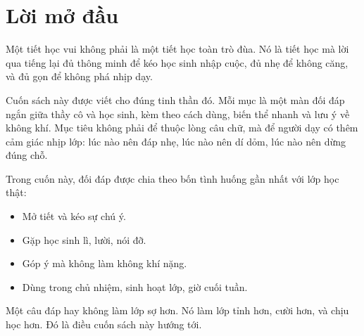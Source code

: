 \chapter*{Lời mở đầu}

Một tiết học vui không phải là một tiết học toàn trò đùa. Nó là tiết học mà lời qua tiếng lại đủ thông minh để kéo học sinh nhập cuộc, đủ nhẹ để không căng, và đủ gọn để không phá nhịp dạy.

Cuốn sách này được viết cho đúng tinh thần đó. Mỗi mục là một màn đối đáp ngắn giữa thầy cô và học sinh, kèm theo cách dùng, biến thể nhanh và lưu ý về không khí. Mục tiêu không phải để thuộc lòng câu chữ, mà để người dạy có thêm cảm giác nhịp lớp: lúc nào nên đáp nhẹ, lúc nào nên dí dỏm, lúc nào nên dừng đúng chỗ.

Trong cuốn này, đối đáp được chia theo bốn tình huống gần nhất với lớp học thật:

\begin{itemize}
\item Mở tiết và kéo sự chú ý.
\item Gặp học sinh lì, lười, nói đỡ.
\item Góp ý mà không làm không khí nặng.
\item Dùng trong chủ nhiệm, sinh hoạt lớp, giờ cuối tuần.
\end{itemize}

Một câu đáp hay không làm lớp sợ hơn. Nó làm lớp tỉnh hơn, cười hơn, và chịu học hơn. Đó là điều cuốn sách này hướng tới.
